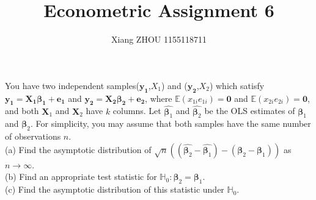\documentclass[12pt]{article}
\newenvironment{question}[2][Question]{\begin{trivlist}
\item[\hskip \labelsep {\bmseries #1}\hskip \labelsep {\bmseries #2.}]}{\end{trivlist}}
\begin{document}
 
\title{Econometric Assignment 6}
\author{Xiang ZHOU 1155118711}
\maketitle
 
\begin{question}{9.2}
You have two independent samples($\bm{y_1}$,$X_1$) and ($\bm{y_2}$,$X_2$) which satisfy $\bm{y_1} = \bm{X_1\beta_1+e_1}$ and $\bm{y_2 = X_2 \beta_2+e_2}$, where $\mathbb{E}(x_{1i}e_{1i}) = \bm{0}$ and $\mathbb{E}(x_{2i}e_{2i}) = \bm{0}$, and both $\bm{X}_1$ and $\bm{X}_2$ have $k$ columns. Let $\hat{\bm{\beta}_1}$ and $\hat{\bm{\beta}_2}$ be the OLS estimates of $\bm{\beta}_1$ and $\bm{\beta}_2$. For simplicity, you may assume that both samples have the same number of observations $n$.\\
(a) Find the asymptotic distribution of $\sqrt{n}((\hat{\bm{\beta}_2}-\hat{\bm{\beta}_1})-(\bm{\beta}_2-\bm{\beta}_1))$ as $n \to \infty$.\\
(b) Find an appropriate test statistic for $\mathbb{H}_0:\bm{\beta}_2 = \bm{\beta}_1$.\\
(c) Find the asymptotic distribution of this statistic under $\mathbb{H}_0$.
\end{question}
\end{document}
